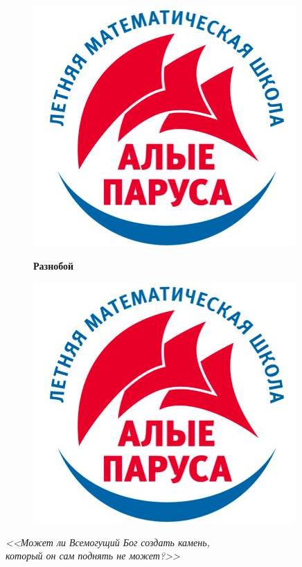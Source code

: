\documentclass[12 pt, a5paper]{article}%
\begin{document}
	\newpage
	\begin{figure}[t]
	\begin{minipage}[h]{0.33\linewidth}
		\includegraphics[width=0.2\linewidth, left]{logo.jpg}
	\end{minipage}
	\begin{minipage}[h]{0.33\linewidth}
		\centering
		\large{\textbf{Разнобой}}\\
	\end{minipage}
	\begin{minipage}[h]{0.32\linewidth}
		\includegraphics[width=0.2\linewidth, right]{logo.jpg}
	\end{minipage}
	\label{ris:image1}
\end{figure}
	
	\begin{flushright}     
		\textit{<<Может ли  Всемогущий Бог создать камень, \\
			который он сам поднять не может?>>}
	\end{flushright}

	
\end{document}

